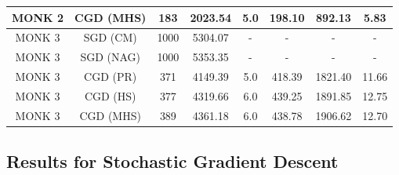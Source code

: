 \begin{table}[H]
\begin{subtable}{\textwidth}
{\begin{tabular}{| c | c | c | c | c | c | c | c |}
                            \hline
                            MONK 2 &  CGD (MHS) &               183 &       2023.54 &            5.0 &   198.10 &   892.13 &      5.83 \\
                            \hline
                            \hline
                            MONK 3 &   SGD (CM) &              1000 &       5304.07 &              - &        - &        - &         - \\
                            \hline
                            MONK 3 &  SGD (NAG) &              1000 &       5353.35 &              - &        - &        - &         - \\
                            \hline
                            \rowcolor[gray]{.9}
                            MONK 3 &   CGD (PR) &               371 &       4149.39 &            5.0 &   418.39 &  1821.40 &     11.66 \\
                            \hline
                            MONK 3 &   CGD (HS) &               377 &       4319.66 &            6.0 &   439.25 &  1891.85 &     12.75 \\
                            \hline
                            MONK 3 &  CGD (MHS) &               389 &       4361.18 &            6.0 &   438.78 &  1906.62 &     12.70 \\
                            \hline
                        \end{tabular}
                    }
                \end{subtable}
            \end{table}


        \subsection{Results for Stochastic Gradient Descent} %
        \label{sub:results_for_stochastic_gradient_descent}

